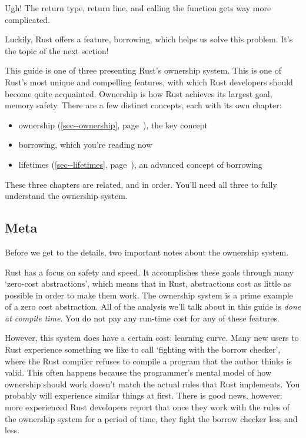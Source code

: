 \documentclass[a4paper,]{book}
\renewcommand*{\hyperref}[2][\ar]{%
  \def\ar{#2}%
  #2 (\autoref{#1}, page~\pageref{#1})}
\begin{document}
Ugh! The return type, return line, and calling the function gets way
more complicated.

Luckily, Rust offers a feature, borrowing, which helps us solve this
problem. It's the topic of the next section!


This guide is one of three presenting Rust's ownership system. This is
one of Rust's most unique and compelling features, with which Rust
developers should become quite acquainted. Ownership is how Rust
achieves its largest goal, memory safety. There are a few distinct
concepts, each with its own chapter:

\begin{itemize}
\itemsep1pt\parskip0pt
\item
  \hyperref[sec--ownership]{ownership}, the key concept
\item
  borrowing, which you're reading now
\item
  \hyperref[sec--lifetimes]{lifetimes}, an advanced concept of borrowing
\end{itemize}

These three chapters are related, and in order. You'll need all three to
fully understand the ownership system.

\subsection{Meta}\label{meta-1}

Before we get to the details, two important notes about the ownership
system.

Rust has a focus on safety and speed. It accomplishes these goals
through many `zero-cost abstractions', which means that in Rust,
abstractions cost as little as possible in order to make them work. The
ownership system is a prime example of a zero cost abstraction. All of
the analysis we'll talk about in this guide is \emph{done at compile
time}. You do not pay any run-time cost for any of these features.

However, this system does have a certain cost: learning curve. Many new
users to Rust experience something we like to call `fighting with the
borrow checker', where the Rust compiler refuses to compile a program
that the author thinks is valid. This often happens because the
programmer's mental model of how ownership should work doesn't match the
actual rules that Rust implements. You probably will experience similar
things at first. There is good news, however: more experienced Rust
developers report that once they work with the rules of the ownership
system for a period of time, they fight the borrow checker less and
less.
\end{document}
